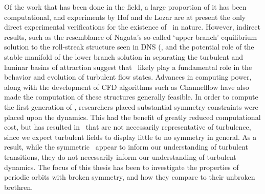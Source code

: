 Of the work that has been done in the field, a large proportion of it has been computational, and experiments by Hof and de Lozar  are at present the only direct experimental verifications for the existence of \ecs~in nature. However, indirect results, such as the resemblance of Nagata's so-called `upper branch' equilibrium solution to the roll-streak structure seen in DNS (, and the potential role of the stable manifold of the lower branch solution in separating the turbulent and laminar basins of attraction suggest that \ecs\ likely play a fundamental role in the behavior and evolution of turbulent flow states. Advances in computing power, along with the development of CFD algorithms such as Channelflow have also made the computation of these structures generally feasible. In order to compute the first generation of \ecs, researchers placed substantial symmetry constraints were placed upon the dynamics. This had the benefit of greatly reduced computational cost, but has resulted in \ecs\ that are not necessarily representative of turbulence, since we expect turbulent fields to display little to no symmetry in general. As a result, while the symmetric \ecs\ 	appear to inform our understanding of turbulent transitions, they do not necessarily inform our understanding of turbulent dynamics. The focus of this thesis has been to investigate the properties of periodic orbits with broken symmetry, and how they compare to their unbroken brethren. 
 
